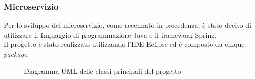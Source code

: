 \subsubsection{Microservizio}
Per lo sviluppo del microservizio, come accennato in precedenza, è stato deciso di utilizzare il linguaggio di programmazione Java e il framework Spring.\\
Il progetto è stato realizzato utilizzando l'IDE Eclipse ed è composto da cinque \emph{package}.
\begin{figure}[h]
	\centering
	\caption{Diagramma UML delle classi principali del progetto}
	\label{fig:one}
\end{figure}

